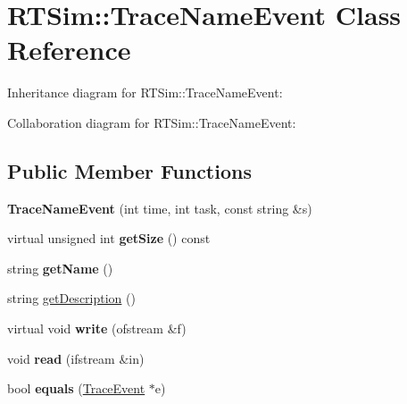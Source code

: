 \hypertarget{classRTSim_1_1TraceNameEvent}{}\section{R\+T\+Sim\+:\+:Trace\+Name\+Event Class Reference}
\label{classRTSim_1_1TraceNameEvent}


Inheritance diagram for R\+T\+Sim\+:\+:Trace\+Name\+Event\+:


Collaboration diagram for R\+T\+Sim\+:\+:Trace\+Name\+Event\+:
\subsection*{Public Member Functions}
\begin{DoxyCompactItemize}
\item 
{\bfseries Trace\+Name\+Event} (int time, int task, const string \&s)\hypertarget{classRTSim_1_1TraceNameEvent_a18502722522d60438e2a059709b926a8}{}\label{classRTSim_1_1TraceNameEvent_a18502722522d60438e2a059709b926a8}

\item 
virtual unsigned int {\bfseries get\+Size} () const \hypertarget{classRTSim_1_1TraceNameEvent_a8c80283b869fe57bf18023a98f4b489d}{}\label{classRTSim_1_1TraceNameEvent_a8c80283b869fe57bf18023a98f4b489d}

\item 
string {\bfseries get\+Name} ()\hypertarget{classRTSim_1_1TraceNameEvent_a01110a48f2dd68f34b0e99d25f764ffa}{}\label{classRTSim_1_1TraceNameEvent_a01110a48f2dd68f34b0e99d25f764ffa}

\item 
string \hyperlink{classRTSim_1_1TraceNameEvent_a3a84ff3b2e33a9fb1b482f82501d344a}{get\+Description} ()
\item 
virtual void {\bfseries write} (ofstream \&f)\hypertarget{classRTSim_1_1TraceNameEvent_a2d30e45885b47bd0273db3204377088b}{}\label{classRTSim_1_1TraceNameEvent_a2d30e45885b47bd0273db3204377088b}

\item 
void {\bfseries read} (ifstream \&in)\hypertarget{classRTSim_1_1TraceNameEvent_afb7f12bffeef5caa0609434ec5077427}{}\label{classRTSim_1_1TraceNameEvent_afb7f12bffeef5caa0609434ec5077427}

\item 
bool {\bfseries equals} (\hyperlink{classRTSim_1_1TraceEvent}{Trace\+Event} $\ast$e)\hypertarget{classRTSim_1_1TraceNameEvent_a6bd7ea2ffa12eb12b3b7eb296241dd5e}{}\label{classRTSim_1_1TraceNameEvent_a6bd7ea2ffa12eb12b3b7eb296241dd5e}

\end{DoxyCompactItemize}
